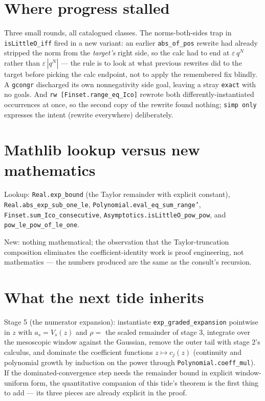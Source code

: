 \documentclass[11pt]{article}
\newcommand{\code}[1]{\texttt{#1}}
\begin{document}
\section{Where progress stalled}

Three small rounds, all catalogued classes. The
norms-both-sides trap in \code{isLittleO\_iff} fired in a new
variant: an earlier \code{abs\_of\_pos} rewrite had already stripped
the norm from the \emph{target's} right side, so the calc had to end
at $\varepsilon\,q^N$ rather than $\varepsilon\,|q^N|$ --- the rule
is to look at what previous rewrites did to the target before picking
the calc endpoint, not to apply the remembered fix blindly. A
\code{gcongr} discharged its own nonnegativity side goal, leaving a
stray \code{exact} with no goals. And
\code{rw [Finset.range\_eq\_Ico]} rewrote both differently-instantiated
occurrences at once, so the second copy of the rewrite found nothing;
\code{simp only} expresses the intent (rewrite everywhere)
deliberately.

\section{Mathlib lookup versus new mathematics}

\begin{sloppypar}
Lookup: \code{Real.exp\_bound} (the Taylor remainder with explicit
constant), \code{Real.abs\_exp\_sub\_one\_le},
\code{Polynomial.eval\_eq\_sum\_range'},
\code{Finset.sum\_Ico\_consecutive},
\code{Asymptotics.isLittleO\_pow\_pow}, and
\code{pow\_le\_pow\_of\_le\_one}.
\end{sloppypar}
New: nothing mathematical; the
observation that the Taylor-truncation composition eliminates the
coefficient-identity work is proof engineering, not mathematics ---
the numbers produced are the same as the consult's recursion.

\section{What the next tide inherits}

Stage 5 (the numerator expansion): instantiate
\code{exp\_graded\_expansion} pointwise in $z$ with
$a_s = V_s(z)$ and $\rho = $ the scaled remainder of stage 3,
integrate over the mesoscopic window against the Gaussian, remove
the outer tail with stage 2's calculus, and dominate the coefficient
functions $z \mapsto c_j(z)$ (continuity and polynomial growth by
induction on the power through \code{Polynomial.coeff\_mul}). If the
dominated-convergence step needs the remainder bound in explicit
window-uniform form, the quantitative companion of this tide's
theorem is the first thing to add --- its three pieces are already
explicit in the proof.
\end{document}
